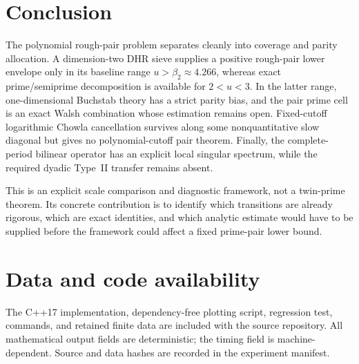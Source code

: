 \documentclass[11pt]{article}
\theoremstyle{definition}
\theoremstyle{remark}
\begin{document}
\section{Conclusion}\label{sec:conclusion}

The polynomial rough-pair problem separates cleanly into coverage and parity allocation.  A dimension-two DHR sieve supplies a positive rough-pair lower envelope only in its baseline range $u>\beta_2\approx4.266$, whereas exact prime/semiprime decomposition is available for $2<u<3$.  In the latter range, one-dimensional Buchstab theory has a strict parity bias, and the pair prime cell is an exact Walsh combination whose estimation remains open.  Fixed-cutoff logarithmic Chowla cancellation survives along some nonquantitative slow diagonal but gives no polynomial-cutoff pair theorem.  Finally, the complete-period bilinear operator has an explicit local singular spectrum, while the required dyadic Type~II transfer remains absent.

This is an explicit scale comparison and diagnostic framework, not a twin-prime theorem.  Its concrete contribution is to identify which transitions are already rigorous, which are exact identities, and which analytic estimate would have to be supplied before the framework could affect a fixed prime-pair lower bound.

\section*{Data and code availability}

The C++17 implementation, dependency-free plotting script, regression test, commands, and retained finite data are included with the source repository.  All mathematical output fields are deterministic; the timing field is machine-dependent.  Source and data hashes are recorded in the experiment manifest.



\end{document}
